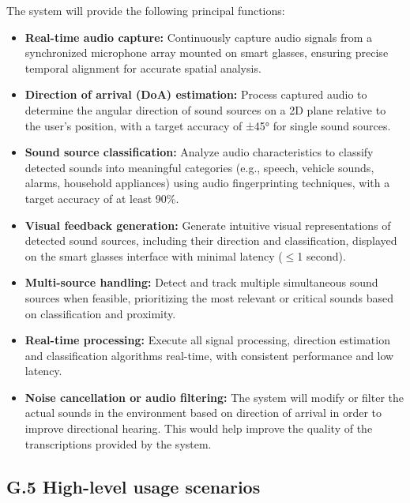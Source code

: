 \documentclass[12pt]{article}
\theoremstyle{definition}
\begin{document}
The system will provide the following principal functions:

\begin{itemize}
\item \textbf{Real-time audio capture:} Continuously capture audio signals
from a synchronized microphone array mounted on smart glasses, ensuring
precise temporal alignment for accurate spatial analysis.

\item \textbf{Direction of arrival (DoA) estimation:} Process captured audio
to determine the angular direction of sound sources on a 2D plane relative
to the user's position, with a target accuracy of ±45° for single sound
sources.

\item \textbf{Sound source classification:} Analyze audio characteristics to
classify detected sounds into meaningful categories (e.g., speech, vehicle
sounds, alarms, household appliances) using audio fingerprinting techniques,
with a target accuracy of at least 90\%.

\item \textbf{Visual feedback generation:} Generate intuitive visual
representations of detected sound sources, including their direction and
classification, displayed on the smart glasses interface with minimal
latency ($\leq$1 second).

\item \textbf{Multi-source handling:} Detect and track multiple simultaneous
sound sources when feasible, prioritizing the most relevant or critical
sounds based on classification and proximity.

\item \textbf{Real-time processing:} Execute all signal processing,
direction estimation and classification algorithms real-time,
with consistent performance and low latency.

\item \textbf{Noise cancellation or audio filtering:} The system will
modify or filter the actual sounds in the environment based on direction
of arrival in order to improve directional hearing. This would help improve
the quality of the transcriptions provided by the system.
\end{itemize}

\subsection{G.5 High-level usage scenarios}
\end{document}
